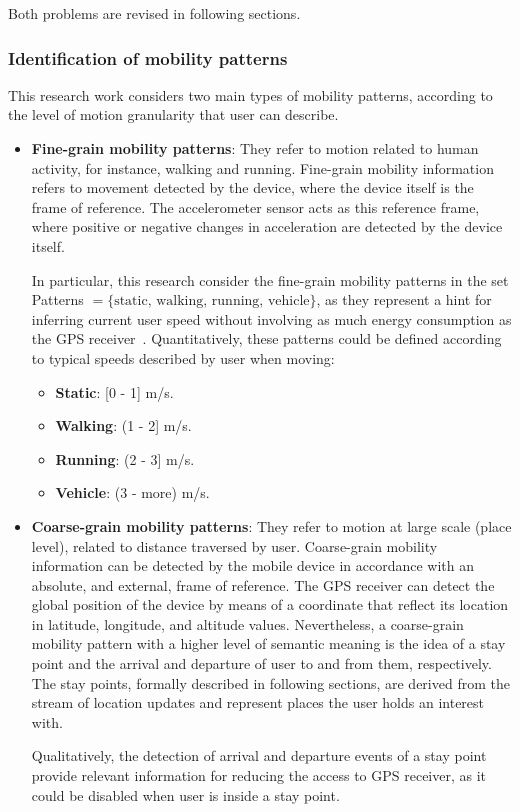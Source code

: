 \documentclass[ENG,PhD]{cinvestav}
\begin{document}
Both problems are revised in following sections.

\subsubsection{Identification of mobility patterns}
This research work considers two main types of mobility patterns, according to the level of motion granularity that user can describe.
\begin{itemize}
  \item \textbf{Fine-grain mobility patterns}: They refer to motion related to human activity, for instance, walking and running.
  Fine-grain mobility information refers to movement detected by the device, where the device itself is the frame of reference.
  The accelerometer sensor acts as this reference frame, where positive or negative changes in acceleration are detected by the device itself.

  In particular, this research consider the fine-grain mobility patterns in the set Patterns  $ = \{ \text{static, walking, running, vehicle} \}$, as they represent a hint for inferring current user speed without involving as much energy consumption as the GPS receiver~\cite{Abdesslem2009}.
  Quantitatively, these patterns could be defined according to typical speeds described by user when moving:
  \begin{itemize}
    \item \textbf{Static}: [0 - 1] m/s.
    \item \textbf{Walking}: (1 - 2] m/s.
    \item \textbf{Running}: (2 - 3] m/s. %
    \item \textbf{Vehicle}: (3 - more) m/s.
  \end{itemize}

  \item \textbf{Coarse-grain mobility patterns}: They refer to motion at large scale (place level), related to distance traversed by user.
  Coarse-grain mobility information can be detected by the mobile device in accordance with an absolute, and external, frame of reference.
  The GPS receiver can detect the global position of the device by means of a coordinate that reflect its location in latitude, longitude, and altitude values.
  Nevertheless, a coarse-grain mobility pattern with a higher level of semantic meaning is the idea of a stay point and the arrival and departure of user to and from them, respectively.
  The stay points, formally described in following sections, are derived from the stream of location updates and represent places the user holds an interest with.

  Qualitatively, the detection of arrival and departure events of a stay point provide relevant information for reducing the access to GPS receiver, as it could be disabled when user is inside a stay point.
\end{itemize}
\end{document}
